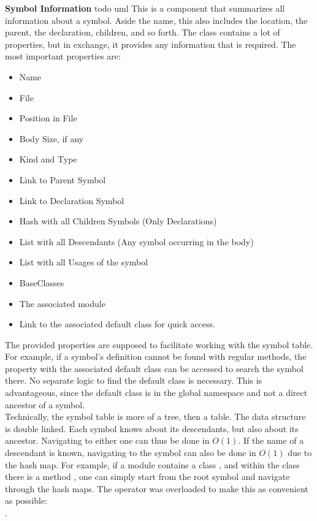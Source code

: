 \textbf{Symbol Information}
todo uml
This is a component that summarizes all information about a symbol.
Aside the name, this also includes the location, the parent, the declaration, children, and so forth.
The class contains a lot of properties, but in exchange, it provides any information that is required.
The most important properties are:
\begin{itemize}
    \item Name
    \item File
    \item Position in File
    \item Body Size, if any
    \item Kind and Type
    \item Link to Parent Symbol
    \item Link to Declaration Symbol
    \item Hash with all Children Symbols (Only Declarations)
    \item List with all Descendants (Any symbol occurring in the body)
    \item List with all Usages of the symbol
    \item BaseClasses
    \item The associated module
    \item Link to the associated default class for quick access.
\end{itemize}
The provided properties are supposed to facilitate working with the symbol table.
For example, if a symbol's definition cannot be found with regular methods, the property with the associated default class can be accessed to search the symbol there.
No separate logic to find the default class is necessary.
This is advantageous, since the default class is in the global namespace and not a direct ancestor of a symbol.\\

Technically, the symbol table is more of a tree, then a table.
The data structure is double linked.
Each symbol knows about its descendants, but also about its ancestor.
Navigating to either one can thus be done in $O(1)$.
If the name of a descendant is known, navigating to the symbol can also be done in $O(1)$ due to the hash map.
For example, if a module  contains a class , and within the class there is a method , one can simply start from the root symbol and navigate through the hash maps.
The \code{[]} operator was overloaded to make this as convenient as possible:\\
.\\

